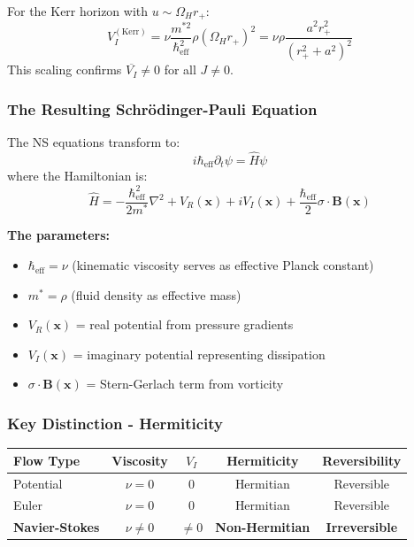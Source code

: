 \documentclass[11pt]{article}
\begin{document}
For the Kerr horizon with $u \sim \Omega_H r_+$:
\begin{equation}
V_I^{(\text{Kerr})} = \nu\frac{m^{*2}}{\hbar_{\text{eff}}^2}\rho(\Omega_H r_+)^2 = \nu\rho\frac{a^2 r_+^2}{(r_+^2 + a^2)^2}
\end{equation}
This scaling confirms $\overline{V_I} \neq 0$ for all $J \neq 0$.

\subsubsection{The Resulting Schr\"odinger-Pauli Equation}

The NS equations transform to:
\begin{equation}
i\hbar_{\text{eff}} \partial_t \psi = \hat{H}\psi
\end{equation}
where the Hamiltonian is:
\begin{equation}
\hat{H} = -\frac{\hbar^2_{\text{eff}}}{2m^*} \nabla^2 + V_R(\mathbf{x}) + iV_I(\mathbf{x}) + \frac{\hbar_{\text{eff}}}{2}\sigma \cdot \mathbf{B}(\mathbf{x})
\end{equation}

\textbf{The parameters:}
\begin{itemize}
\item $\hbar_{\text{eff}} = \nu$ (kinematic viscosity serves as effective Planck constant)
\item $m^* = \rho$ (fluid density as effective mass)
\item $V_R(\mathbf{x})$ = real potential from pressure gradients
\item $V_I(\mathbf{x})$ = imaginary potential representing dissipation
\item $\sigma \cdot \mathbf{B}(\mathbf{x})$ = Stern-Gerlach term from vorticity
\end{itemize}

\subsubsection{Key Distinction - Hermiticity}

\begin{center}
\begin{tabular}{|l|c|c|c|c|}
\hline
\textbf{Flow Type} & \textbf{Viscosity} & $V_I$ & \textbf{Hermiticity} & \textbf{Reversibility} \\
\hline
Potential & $\nu = 0$ & 0 & Hermitian & Reversible \\
Euler & $\nu = 0$ & 0 & Hermitian & Reversible \\
\textbf{Navier-Stokes} & $\nu \neq 0$ & $\neq 0$ & \textbf{Non-Hermitian} & \textbf{Irreversible} \\
\hline
\end{tabular}
\end{center}
\end{document}
